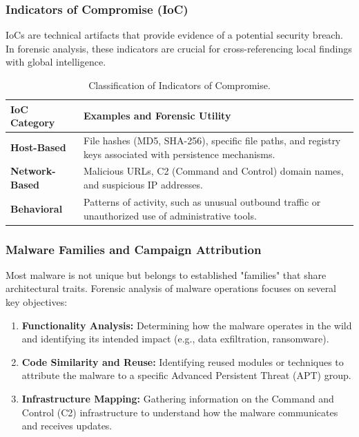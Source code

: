 \subsubsection*{Indicators of Compromise (IoC)}
IoCs are technical artifacts that provide evidence of a potential security breach. In forensic analysis, these indicators are crucial for cross-referencing local findings with global intelligence.

\begin{table}[H]
\centering
\small
\begin{tabular}{|p{3cm}|p{8.5cm}|}
\hline
\textbf{IoC Category} & \textbf{Examples and Forensic Utility} \\
\hline
\textbf{Host-Based} & File hashes (MD5, SHA-256), specific file paths, and registry keys associated with persistence mechanisms. \\
\hline
\textbf{Network-Based} & Malicious URLs, C2 (Command and Control) domain names, and suspicious IP addresses. \\
\hline
\textbf{Behavioral} & Patterns of activity, such as unusual outbound traffic or unauthorized use of administrative tools. \\
\hline
\end{tabular}
\caption{Classification of Indicators of Compromise.}
\end{table}

\subsubsection*{Malware Families and Campaign Attribution}
Most malware is not unique but belongs to established "families" that share architectural traits. Forensic analysis of malware operations focuses on several key objectives:
\begin{enumerate}
    \item \textbf{Functionality Analysis:} Determining how the malware operates in the wild and identifying its intended impact (e.g., data exfiltration, ransomware).
    \item \textbf{Code Similarity and Reuse:} Identifying reused modules or techniques to attribute the malware to a specific Advanced Persistent Threat (APT) group.
    \item \textbf{Infrastructure Mapping:} Gathering information on the Command and Control (C2) infrastructure to understand how the malware communicates and receives updates.
\end{enumerate}

